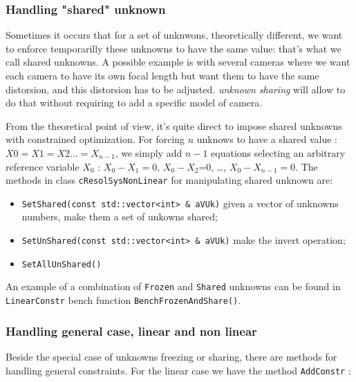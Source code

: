 
\subsubsection{Handling "shared" unknown}

Sometimes it occurs  that for a set of unknwons, theoretically different,  we want to enforce
temporarilly these unknowns to have the same value: that's what we call shared unknowns. 
A possible example is with several cameras where we want each camera to have its own focal length
but want them to have the same distorsion, and this distorsion
has to be adjusted.  \emph{unknown sharing} will allow to do that without requiring to add a specific model of camera.

From the theoretical point of view, it's quite direct to impose shared unknowns  with constrained optimization.  For forcing
$n$ unknows to have a shared value : $X0=X1=X2\dots=X_{n-1}$, we simply add $n-1$ equations selecting
an arbitrary reference variable $X_0$ : $X_0-X_1=0$, $X_0-X_2$=0, \dots , $X_0-X_{n-1}=0$.
The methods in class {\tt cResolSysNonLinear} for manipulating shared unknown are:

\begin{itemize}
    \item   {\tt SetShared(const std::vector<int> \&  aVUk)}  given a vector of unknowns numbers,
            make them a set of unkowns shared;
    \item   {\tt SetUnShared(const std::vector<int> \&  aVUk)} make the invert operation;
    \item   {\tt SetAllUnShared()} 
\end{itemize}

An example of a combination of {\tt Frozen} and {\tt Shared} unknowns can be found in {\tt LinearConstr} bench function {\tt BenchFrozenAndShare()}.


\subsubsection{Handling general case, linear and non linear}

Beside the special case of unknowns freezing or sharing, there are methods for handling general constraints.
For the linear case we have the method {\tt AddConstr} :

